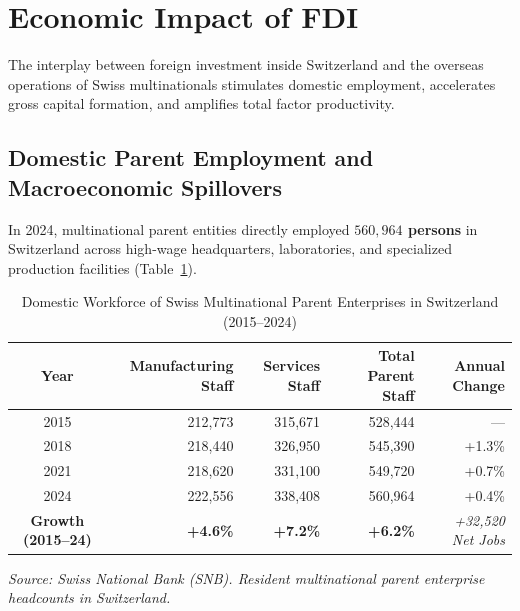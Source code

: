 
\section{Economic Impact of FDI}

The interplay between foreign investment inside Switzerland and the overseas operations of Swiss multinationals stimulates domestic employment, accelerates gross capital formation, and amplifies total factor productivity.

\subsection{Domestic Parent Employment and Macroeconomic Spillovers}

In 2024, multinational parent entities directly employed \textbf{$560,964$ persons} in Switzerland across high-wage headquarters, laboratories, and specialized production facilities (Table~\ref{tab:domestic_parent_employment}).

\begin{table}[H]
\centering
\small
\caption{Domestic Workforce of Swiss Multinational Parent Enterprises in Switzerland (2015--2024)}
\label{tab:domestic_parent_employment}
\setlength{\tabcolsep}{4.0pt}
\renewcommand{\arraystretch}{1.12}
\begin{tabular}{c r r r r}
\toprule
\rowcolor{tableheadbg}
\textbf{Year} & \textbf{Manufacturing Staff} & \textbf{Services Staff} & \textbf{Total Parent Staff} & \textbf{Annual Change} \\
\midrule
2015 & 212,773 & 315,671 & 528,444 & --- \\
\rowcolor{tablerowbg}
2018 & 218,440 & 326,950 & 545,390 & +1.3\% \\
2021 & 218,620 & 331,100 & 549,720 & +0.7\% \\
\rowcolor{tablerowbg}
2024 & 222,556 & 338,408 & 560,964 & +0.4\% \\
\midrule
\textbf{Growth (2015--24)} & \textbf{+4.6\%} & \textbf{+7.2\%} & \textbf{+6.2\%} & \textit{+32,520 Net Jobs} \\
\bottomrule
\end{tabular}
\par\vspace{0.3em}
\footnotesize
\textit{Source: Swiss National Bank (SNB). Resident multinational parent enterprise headcounts in Switzerland.}
\normalsize
\end{table}

